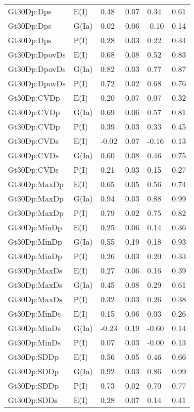 \begin{center}
\begin{longtable}{|p{1.1in}|p{0.7in}|p{0.7in}|p{0.6in}|p{0.6in}|p{0.6in}|}
  Gt30Dp:Dps & E(I) & 0.48 & 0.07 & 0.34 & 0.61 \\ 
  Gt30Dp:Dps & G(Ia) & 0.02 & 0.06 & -0.10 & 0.14 \\ 
  Gt30Dp:Dps & P(I) & 0.28 & 0.03 & 0.22 & 0.34 \\ 
  Gt30Dp:DpovDs & E(I) & 0.68 & 0.08 & 0.52 & 0.83 \\ 
  Gt30Dp:DpovDs & G(Ia) & 0.82 & 0.03 & 0.77 & 0.87 \\ 
  Gt30Dp:DpovDs & P(I) & 0.72 & 0.02 & 0.68 & 0.76 \\ 
  Gt30Dp:CVDp & E(I) & 0.20 & 0.07 & 0.07 & 0.32 \\ 
  Gt30Dp:CVDp & G(Ia) & 0.69 & 0.06 & 0.57 & 0.81 \\ 
  Gt30Dp:CVDp & P(I) & 0.39 & 0.03 & 0.33 & 0.45 \\ 
  Gt30Dp:CVDs & E(I) & -0.02 & 0.07 & -0.16 & 0.13 \\ 
  Gt30Dp:CVDs & G(Ia) & 0.60 & 0.08 & 0.46 & 0.75 \\ 
  Gt30Dp:CVDs & P(I) & 0.21 & 0.03 & 0.15 & 0.27 \\ 
  Gt30Dp:MaxDp & E(I) & 0.65 & 0.05 & 0.56 & 0.74 \\ 
  Gt30Dp:MaxDp & G(Ia) & 0.94 & 0.03 & 0.88 & 0.99 \\ 
  Gt30Dp:MaxDp & P(I) & 0.79 & 0.02 & 0.75 & 0.82 \\ 
  Gt30Dp:MinDp & E(I) & 0.25 & 0.06 & 0.14 & 0.36 \\ 
  Gt30Dp:MinDp & G(Ia) & 0.55 & 0.19 & 0.18 & 0.93 \\ 
  Gt30Dp:MinDp & P(I) & 0.26 & 0.03 & 0.20 & 0.33 \\ 
  Gt30Dp:MaxDs & E(I) & 0.27 & 0.06 & 0.16 & 0.39 \\ 
  Gt30Dp:MaxDs & G(Ia) & 0.45 & 0.08 & 0.29 & 0.61 \\ 
  Gt30Dp:MaxDs & P(I) & 0.32 & 0.03 & 0.26 & 0.38 \\ 
  Gt30Dp:MinDs & E(I) & 0.15 & 0.06 & 0.03 & 0.26 \\ 
  Gt30Dp:MinDs & G(Ia) & -0.23 & 0.19 & -0.60 & 0.14 \\ 
  Gt30Dp:MinDs & P(I) & 0.07 & 0.03 & -0.00 & 0.13 \\ 
  Gt30Dp:SDDp & E(I) & 0.56 & 0.05 & 0.46 & 0.66 \\ 
  Gt30Dp:SDDp & G(Ia) & 0.92 & 0.03 & 0.86 & 0.99 \\ 
  Gt30Dp:SDDp & P(I) & 0.73 & 0.02 & 0.70 & 0.77 \\ 
  Gt30Dp:SDDs & E(I) & 0.28 & 0.07 & 0.14 & 0.41 \\ 

\end{longtable}
\end{center}
